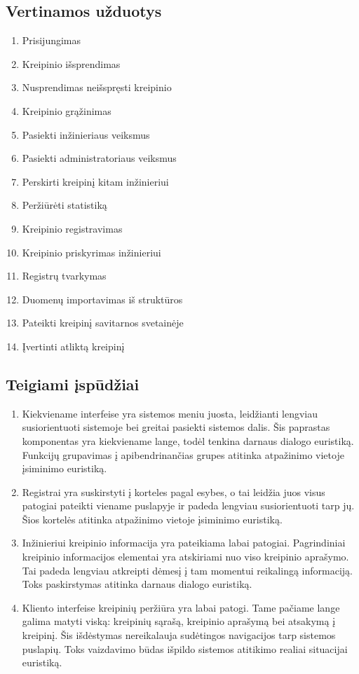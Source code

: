 \subsection{Vertinamos užduotys}
	\begin{enumerate}
	\item Prisijungimas
	\item Kreipinio išsprendimas
	\item Nusprendimas neišspręsti kreipinio
	\item Kreipinio grąžinimas
	\item Pasiekti inžinieriaus veiksmus
	\item Pasiekti administratoriaus veiksmus
	\item Perskirti kreipinį kitam inžinieriui
	\item Peržiūrėti statistiką
	\item Kreipinio registravimas
	\item Kreipinio priskyrimas inžinieriui
	\item Registrų tvarkymas
	\item Duomenų importavimas iš struktūros
	\item Pateikti kreipinį savitarnos svetainėje
	\item Įvertinti atliktą kreipinį
	\end{enumerate}
	
\subsection{Teigiami įspūdžiai}
	\begin{enumerate}
	\item Kiekviename interfeise yra sistemos meniu juosta, leidžianti lengviau susiorientuoti sistemoje bei greitai pasiekti sistemos dalis.
	Šis paprastas komponentas yra kiekviename lange, todėl tenkina darnaus dialogo euristiką.
	Funkcijų grupavimas į apibendrinančias grupes atitinka atpažinimo vietoje įsiminimo euristiką.
	\item Registrai yra suskirstyti į korteles pagal esybes, o tai leidžia juos visus patogiai pateikti viename puslapyje ir padeda lengviau susiorientuoti tarp jų.
	Šios kortelės atitinka atpažinimo vietoje įsiminimo euristiką.
	\item Inžinieriui kreipinio informacija yra pateikiama labai patogiai. Pagrindiniai kreipinio informacijos elementai yra atskiriami nuo viso kreipinio aprašymo.
	Tai padeda lengviau atkreipti dėmesį į tam momentui reikalingą informaciją.
	Toks paskirstymas atitinka darnaus dialogo euristiką.
	\item Kliento interfeise kreipinių peržiūra yra labai patogi.
	Tame pačiame lange galima matyti viską: kreipinių sąrašą, kreipinio aprašymą bei atsakymą į kreipinį.
	Šis išdėstymas nereikalauja sudėtingos navigacijos tarp sistemos puslapių.
	Toks vaizdavimo būdas išpildo sistemos atitikimo realiai situacijai euristiką.
	\end{enumerate}
	
